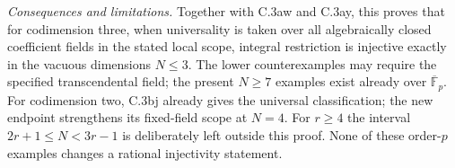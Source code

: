 \noindent\emph{Consequences and limitations.}
Together with C.3aw and C.3ay, this proves that for codimension three,
when universality is taken over all algebraically closed coefficient
fields in the stated local scope, integral restriction is injective
exactly in the vacuous dimensions $N\le3$. The lower counterexamples
may require the specified transcendental field; the present
$N\ge7$ examples exist already over $\overline{\mathbb F}_p$.
For codimension two, C.3bj already gives the universal classification;
the new endpoint strengthens its fixed-field scope at $N=4$.
For $r\ge4$ the interval $2r+1\le N<3r-1$ is deliberately left
outside this proof. None of these order-$p$ examples changes a
rational injectivity statement.
